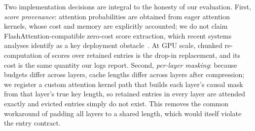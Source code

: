 Two implementation decisions are integral to the honesty of our
evaluation. First, \emph{score provenance}: attention probabilities are
obtained from eager attention kernels, whose cost and memory are
explicitly accounted; we do not claim FlashAttention-compatible
zero-cost score extraction, which recent systems analyses identify as a
key deployment obstacle~\cite{mao2026infra,dao2023flashattention2}. At
GPU scale, chunked re-computation of scores over retained entries is the
drop-in replacement, and its cost is the same quantity our logs report.
Second, \emph{per-layer masking}: because budgets differ across layers,
cache lengths differ across layers after compression; we register a
custom attention kernel path that builds each layer's causal mask from
that layer's true key length, so retained entries in every layer are
attended exactly and evicted entries simply do not exist. This removes
the common workaround of padding all layers to a shared length, which
would itself violate the entry contract.
